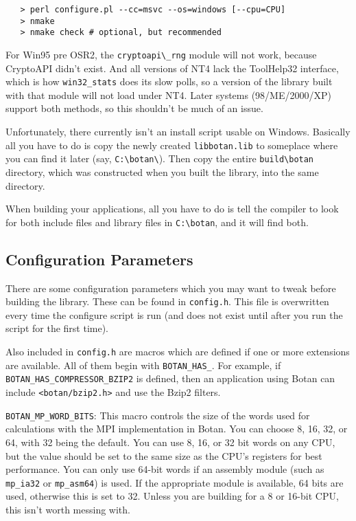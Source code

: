 \documentclass{article}
\newcommand{\filename}[1]{\texttt{#1}}
\newcommand{\module}[1]{\texttt{#1}}
\newcommand{\macro}[1]{\texttt{#1}}
\begin{document}
\begin{verbatim}
   > perl configure.pl --cc=msvc --os=windows [--cpu=CPU]
   > nmake
   > nmake check # optional, but recommended
\end{verbatim}

For Win95 pre OSR2, the \verb|cryptoapi\_rng| module will not work,
because CryptoAPI didn't exist. And all versions of NT4 lack the
ToolHelp32 interface, which is how \verb|win32_stats| does its slow
polls, so a version of the library built with that module will not
load under NT4. Later systems (98/ME/2000/XP) support both methods, so
this shouldn't be much of an issue.

Unfortunately, there currently isn't an install script usable on
Windows. Basically all you have to do is copy the newly created
\filename{libbotan.lib} to someplace where you can find it later (say,
\verb|C:\botan\|). Then copy the entire \verb|build\botan|
directory, which was constructed when you built the library, into the
same directory.

When building your applications, all you have to do is tell the compiler to
look for both include files and library files in \verb|C:\botan|, and it will
find both.

\pagebreak

\subsection{Configuration Parameters}

There are some configuration parameters which you may want to tweak
before building the library. These can be found in
\filename{config.h}. This file is overwritten every time the configure
script is run (and does not exist until after you run the script for
the first time).

Also included in \filename{config.h} are macros which are defined if
one or more extensions are available. All of them begin with
\verb|BOTAN_HAS_|. For example, if \verb|BOTAN_HAS_COMPRESSOR_BZIP2|
is defined, then an application using Botan can include
\filename{<botan/bzip2.h>} and use the Bzip2 filters.

\macro{BOTAN\_MP\_WORD\_BITS}: This macro controls the size of the
words used for calculations with the MPI implementation in Botan. You
can choose 8, 16, 32, or 64, with 32 being the default. You can use 8,
16, or 32 bit words on any CPU, but the value should be set to the
same size as the CPU's registers for best performance. You can only
use 64-bit words if an assembly module (such as \module{mp\_ia32} or
\module{mp\_asm64}) is used. If the appropriate module is available,
64 bits are used, otherwise this is set to 32. Unless you are building
for a 8 or 16-bit CPU, this isn't worth messing with.
\end{document}
